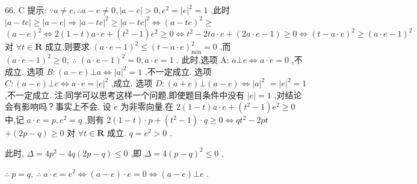 66. C 提示: $\because a \neq  e,\therefore a - e \neq  0,\left| {a - e}\right|  > 0,{e}^{2} = {\left| e\right| }^{2} = 1$ ,此时 $\left| {a - {te}}\right|  \geq  \left| {a - e}\right|  \Rightarrow  {\left| a - te\right| }^{2} \geq  {\left| a - te\right| }^{2} \Leftrightarrow  {\left( a - te\right) }^{2} \geq$  ${\left( a - e\right) }^{2} \Leftrightarrow  2\left( {1 - t}\right) a \cdot  e + \left( {{t}^{2} - 1}\right) {e}^{2} \geq  0 \Leftrightarrow  {t}^{2} - {2ta} \cdot  e + \left( {{2a} \cdot  e - 1}\right)  \geq  0 \Leftrightarrow  {\left( t - a \cdot  e\right) }^{2} \geq  {\left( a \cdot  e - 1\right) }^{2}$ 对 $\forall t \in  \mathbf{R}$ 成立,则要求 ${\left( a \cdot  e - 1\right) }^{2} \leq  {\left( t - a \cdot  e\right) }_{\min }^{2} = 0$ ,而 ${\left( a \cdot  e - 1\right) }^{2} \geq  0,\;\therefore \;{\left( a \cdot  e - 1\right) }^{2} = 0,a \cdot  e = 1$ . 此时,选项 A: $a \bot  e \Leftrightarrow  a \cdot  e = 0$ ,不成立. 选项 $B : \left( {a - e}\right)  \bot  a \Leftrightarrow  {\left| a\right| }^{2} = 1$ ,不一定成立. 选项 $C : \left( {a - e}\right)  \bot  e \Leftrightarrow  a \cdot  e = {\left| e\right| }^{2}$ ,成立. 选项 $D : \left( {a + e}\right)  \bot  \left( {a - e}\right)  \Leftrightarrow  {\left| a\right| }^{2}$  $= {\left| e\right| }^{2} = 1$ ,不一定成立. 注:同学可以思考这样一个问题,即使题目条件中没有 $\left| e\right|  = 1$ ,对结论会有影响吗？事实上不会. 设 $e$ 为非零向量,在 $2\left( {1 - t}\right) a \cdot  e + \left( {{t}^{2} - 1}\right) {e}^{2} \geq  0$ 中,记 $a \cdot  e = p,{e}^{2} = q$ ,则有 $2\left( {1 - t}\right)  \cdot  p + \left( {{t}^{2} - 1}\right)  \cdot  q \geq  0 \Leftrightarrow  q{t}^{2} - {2pt}$  $+ \left( {{2p} - q}\right)  \geq  0$ 对 $\forall t \in  \mathbf{R}$ 成立. $q = {e}^{2} > 0$ .

此时, $\Delta  = 4{p}^{2} - {4q}\left( {{2p} - q}\right)  \leq  0$ ,即 $\Delta  = 4{\left( p - q\right) }^{2} \leq  0$ ,

$\therefore \;p = q,\;\therefore \;a \cdot  e = {e}^{2} \Leftrightarrow  \left( {a - e}\right)  \cdot  e = 0 \Leftrightarrow  \left( {a - e}\right)  \bot  e$ .

